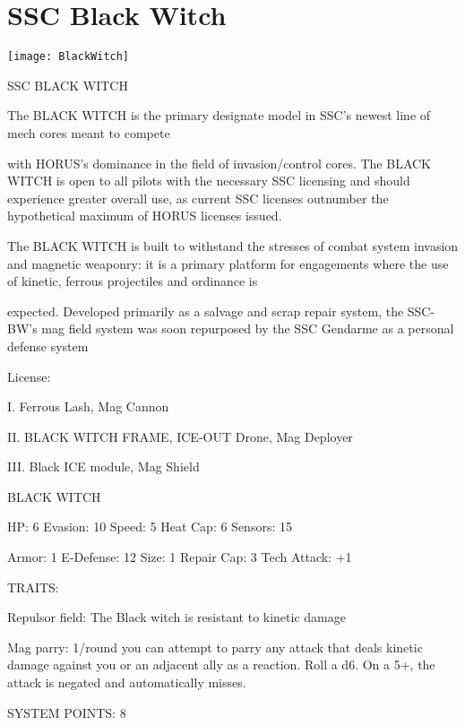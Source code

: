 \section{SSC Black Witch}

\texttt{[image: BlackWitch]}


                                            SSC BLACK WITCH

The BLACK WITCH is the primary designate model in SSC’s newest line of mech cores meant to compete

with HORUS’s dominance in the field of invasion/control cores. The BLACK WITCH is open to all pilots with
the necessary SSC licensing and should experience greater overall use, as current SSC licenses outnumber
the hypothetical maximum of HORUS licenses issued.

The BLACK WITCH is built to withstand the stresses of combat system invasion and magnetic weaponry: it
is a primary platform for engagements where the use of kinetic, ferrous projectiles and ordinance is

expected. Developed primarily as a salvage and scrap repair system, the SSC-BW’s mag field system was
soon repurposed by the SSC Gendarme as a personal defense system




                                                  License:

I. Ferrous Lash, Mag Cannon

II. BLACK WITCH FRAME, ICE-OUT Drone, Mag Deployer

III. Black ICE module, Mag Shield


                                             BLACK WITCH

 HP: 6          Evasion: 10                          Speed: 5           Heat Cap: 6        Sensors: 15

 Armor: 1       E-Defense: 12                        Size: 1            Repair Cap: 3      Tech Attack:
                                                                                           +1

                                                  TRAITS:

 Repulsor field: The Black witch is resistant to kinetic damage

 Mag parry: 1/round you can attempt to parry any attack that deals kinetic damage against you or an
 adjacent ally as a reaction. Roll a d6. On a 5+, the attack is negated and automatically misses.

                                            SYSTEM POINTS: 8

